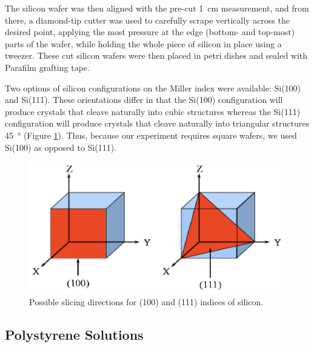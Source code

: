 \documentclass[twocolumn]{article}
\begin{document}
            The silicon wafer was then aligned with the pre-cut \qty{1}{\centi\meter} measurement, and from there, a diamond-tip cutter was used to carefully scrape vertically across the desired point, applying the most pressure at the edge (bottom- and top-most) parts of the wafer, while holding the whole piece of silicon in place using a tweezer. These cut silicon wafers were then placed in petri dishes and sealed with Parafilm grafting tape.

            Two options of silicon configurations on the Miller index were available: Si(100) and Si(111). These orientations differ in that the Si(100) configuration will produce crystals that cleave naturally into cubic structures whereas the Si(111) configuration will produce crystals that cleave naturally into triangular structures \qty{45}{\degree} (Figure \ref{fig:silicon}). Thus, because our experiment requires square wafers, we used Si(100) as opposed to Si(111).

            \begin{figure}
                \centering
                \includegraphics[width=0.8\columnwidth]{img/silicon.png}
                \caption{Possible slicing directions for (100) and (111) indices of silicon.}\label{fig:silicon}
            \end{figure}

            \subsection{Polystyrene Solutions}
\end{document}
